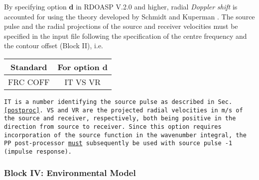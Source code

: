 
By specifying option {\bf d} in RDOASP V.2.0 and higher,
radial {\em Doppler shift} is accounted for 
using the theory developed by Schmidt and Kuperman
\cite{sk:jasa94}.  The source pulse and the radial projections of the
source and  receiver velocities must be specified in the input file
following the specification of the centre frequency and the contour
offset (Block II), i.e.

\begin{tabular}{cc}
   Standard   &    For option {\bf d} \\ \hline
FRC COFF & IT VS VR
\end{tabular}


\tt IT \rm is a number identifying the source pulse as described
in Sec.\,\ref{postproc}. \tt VS \rm and \tt VR \rm are the
projected radial velocities in m/s of the source and receiver, respectively,
both being positive in the direction from source to receiver.
Since this option requires incorporation of the
source function in the wavenumber integral, the PP post-processor
\underline{must} subsequently be used with source pulse -1 (impulse response).


\subsubsection{Block IV: Environmental Model}

